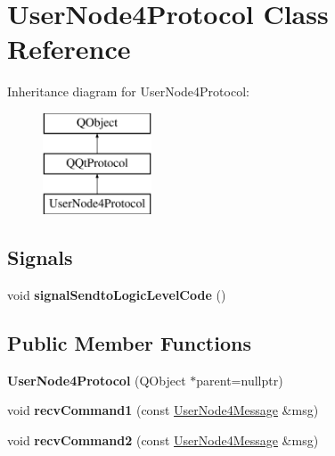 \hypertarget{class_user_node4_protocol}{}\section{User\+Node4\+Protocol Class Reference}
\label{class_user_node4_protocol}
Inheritance diagram for User\+Node4\+Protocol\+:\begin{figure}[H]
\begin{center}
\leavevmode
\includegraphics[height=3.000000cm]{class_user_node4_protocol}
\end{center}
\end{figure}
\subsection*{Signals}
\begin{DoxyCompactItemize}
\item 
\mbox{\label{class_user_node4_protocol_a54438ee23ee1f9146a2fafdf09068f7c}} 
void {\bfseries signal\+Sendto\+Logic\+Level\+Code} ()
\end{DoxyCompactItemize}
\subsection*{Public Member Functions}
\begin{DoxyCompactItemize}
\item 
\mbox{\label{class_user_node4_protocol_a9ffc6a1e73872291f08e5038bc92c051}} 
{\bfseries User\+Node4\+Protocol} (Q\+Object $\ast$parent=nullptr)
\item 
\mbox{\label{class_user_node4_protocol_a2afb9576091cf1eee81e63b5f3a22082}} 
void {\bfseries recv\+Command1} (const \mbox{\hyperlink{class_user_node4_message}{User\+Node4\+Message}} \&msg)
\item 
\mbox{\label{class_user_node4_protocol_a439b7cbd81791cb3f7392bd92276ce2f}} 
void {\bfseries recv\+Command2} (const \mbox{\hyperlink{class_user_node4_message}{User\+Node4\+Message}} \&msg)
\end{DoxyCompactItemize}

